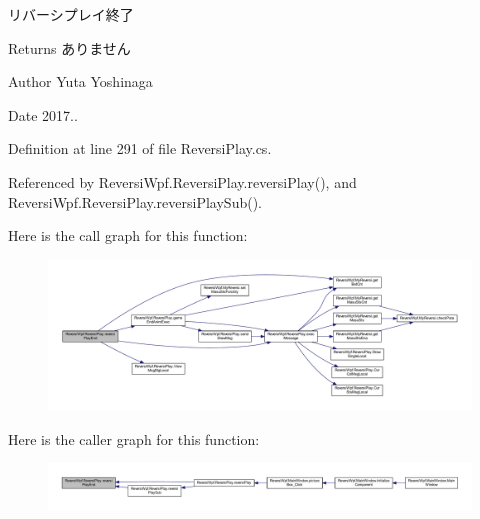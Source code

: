 リバーシプレイ終了 

\begin{DoxyReturn}{Returns}
ありません 
\end{DoxyReturn}
\begin{DoxyAuthor}{Author}
Yuta Yoshinaga 
\end{DoxyAuthor}
\begin{DoxyDate}{Date}
2017.. 
\end{DoxyDate}


Definition at line 291 of file Reversi\+Play.\+cs.



Referenced by Reversi\+Wpf.\+Reversi\+Play.\+reversi\+Play(), and Reversi\+Wpf.\+Reversi\+Play.\+reversi\+Play\+Sub().

Here is the call graph for this function\+:\nopagebreak
\begin{figure}[H]
\begin{center}
\leavevmode
\includegraphics[width=350pt]{class_reversi_wpf_1_1_reversi_play_a091d27bec4b3570ab595a49170342105_cgraph}
\end{center}
\end{figure}
Here is the caller graph for this function\+:\nopagebreak
\begin{figure}[H]
\begin{center}
\leavevmode
\includegraphics[width=350pt]{class_reversi_wpf_1_1_reversi_play_a091d27bec4b3570ab595a49170342105_icgraph}
\end{center}
\end{figure}
\mbox{\label{class_reversi_wpf_1_1_reversi_play_a3aca2f66c873be50dca194a396d34bd7}} 
